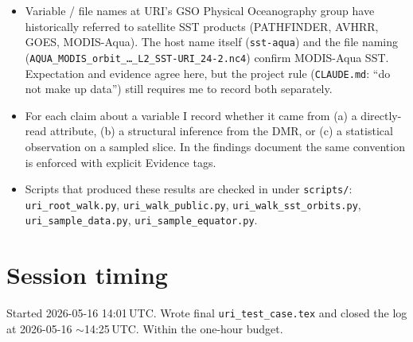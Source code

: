\documentclass[11pt]{article}
\begin{document}
\begin{itemize}
  \item Variable / file names at URI's GSO Physical Oceanography
    group have historically referred to satellite SST products
    (PATHFINDER, AVHRR, GOES, MODIS-Aqua). The host name itself
    (\texttt{sst-aqua}) and the file naming
    (\texttt{AQUA\_MODIS\_orbit\_\dots\_L2\_SST-URI\_24-2.nc4})
    confirm MODIS-Aqua SST. Expectation and evidence agree here,
    but the project rule (\texttt{CLAUDE.md}: ``do not make up
    data'') still requires me to record both separately.
  \item For each claim about a variable I record whether it came
    from (a) a directly-read attribute, (b) a structural inference
    from the DMR, or (c) a statistical observation on a sampled
    slice. In the findings document the same convention is enforced
    with explicit Evidence tags.
  \item Scripts that produced these results are checked in under
    \texttt{scripts/}:
    \texttt{uri\_root\_walk.py},
    \texttt{uri\_walk\_public.py},
    \texttt{uri\_walk\_sst\_orbits.py},
    \texttt{uri\_sample\_data.py},
    \texttt{uri\_sample\_equator.py}.
\end{itemize}

\section{Session timing}

Started 2026-05-16 14:01\,UTC. Wrote final
\texttt{uri\_test\_case.tex} and closed the log at
2026-05-16 $\sim$14:25\,UTC. Within the one-hour budget.
\end{document}
